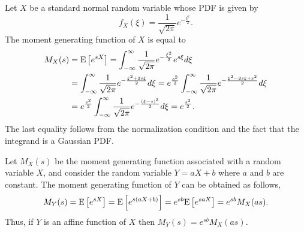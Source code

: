 \begin{example}
Let $X$ be a standard normal random variable whose PDF is given by
\begin{equation*}
f_X (\xi) = \frac{1}{\sqrt{2 \pi}} e^{- \frac{\xi^2}{2}}.
\end{equation*}
The moment generating function of $X$ is equal to
\begin{equation*}
\begin{split}
M_X (s) &= \mathrm{E} \left[ e^{sX} \right]
= \int_{- \infty}^{\infty} \frac{1}{\sqrt{2 \pi}} e^{- \frac{\xi^2}{2}} e^{s\xi} d\xi \\
&= \int_{- \infty}^{\infty} \frac{1}{\sqrt{2 \pi}} e^{- \frac{\xi^2 + 2 s \xi}{2}} d\xi
= e^{\frac{s^2}{2}} \int_{- \infty}^{\infty}
\frac{1}{\sqrt{2 \pi}} e^{- \frac{\xi^2 - 2 s \xi + s^2}{2}} d\xi \\
&= e^{\frac{s^2}{2}} \int_{- \infty}^{\infty}
\frac{1}{\sqrt{2 \pi}} e^{- \frac{(\xi - s)^2}{2}} d\xi
= e^{\frac{s^2}{2}} .
\end{split}
\end{equation*}
The last equality follows from the normalization condition and the fact that the integrand is a Gaussian PDF.
\end{example}

Let $M_X(s)$ be the moment generating function associated with a random variable $X$, and consider the random variable $Y = aX + b$ where $a$ and $b$ are constant.
The moment generating function of $Y$ can be obtained as follows,
\begin{equation*}
M_Y (s) = \mathrm{E} \left[ e^{s X} \right]
= \mathrm{E} \left[ e^{s (aX + b)} \right]
= e^{sb} \mathrm{E} \left[ e^{saX} \right]
= e^{sb} M_X (as) .
\end{equation*}
Thus, if $Y$ is an affine function of $X$ then $M_Y (s) = e^{sb} M_X (as)$.

